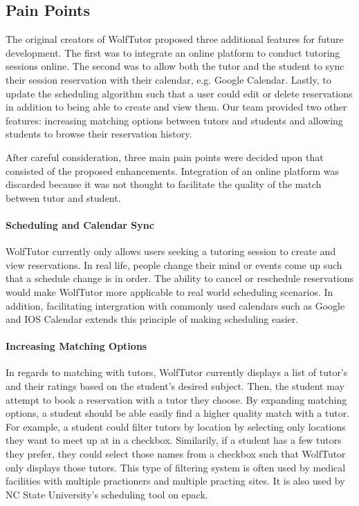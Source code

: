 

\subsection{Pain Points}
\label{sec:pain-points}
The original creators of WolfTutor proposed three additional features for future development. The first was to integrate an online platform to conduct tutoring sessions online. The second was to allow both the tutor and the student to sync their session reservation with their calendar, e.g. Google Calendar. Lastly, to update the scheduling algorithm such that a user could edit or delete reservations in addition to being able to create and view them. Our team provided two other features: increasing matching options between tutors and students and allowing students to browse their reservation history. 

After careful consideration, three main pain points were decided upon that consisted of the proposed enhancements. Integration of an online platform was discarded because it was not thought to facilitate the quality of the match between tutor and student.

\paragraph{Scheduling and Calendar Sync}
WolfTutor currently only allows users seeking a tutoring session to create and view reservations. In real life, people change their mind or events come up such that a schedule change is in order. The ability to cancel or reschedule reservations would make WolfTutor more applicable to real world scheduling scenarios. In addition, facilitating intergration with commonly used calendars such as Google and IOS Calendar extends this principle of making scheduling easier.

\paragraph{Increasing Matching Options}
In regards to matching with tutors, WolfTutor currently displays a list of tutor's and their ratings based on the student's desired subject. Then, the student may attempt to book a reservation with a tutor they choose. By expanding matching options, a student should be able easily find a higher quality match with a tutor. For example, a student could filter tutors by location by selecting only locations they want to meet up at in a checkbox. Similarily, if a student has a few tutors they prefer, they could select those names from a checkbox such that WolfTutor only displays those tutors. This type of filtering system is often used by medical facilities with multiple practioners and multiple practing sites. It is also used by NC State University's scheduling tool on epack.

